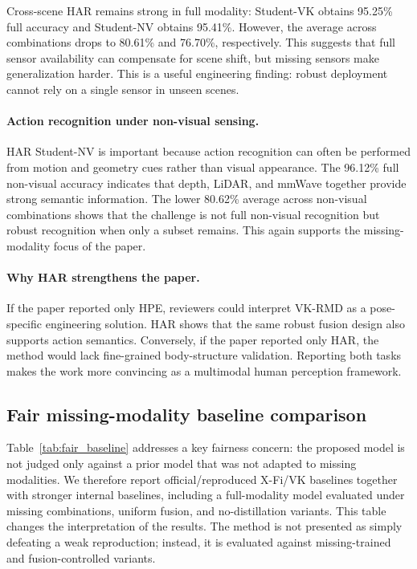 \documentclass[preprint,12pt]{elsarticle}
\newcommand{\method}{VK-RMD}
\begin{document}
Cross-scene HAR remains strong in full modality: Student-VK obtains 95.25\% full accuracy and Student-NV obtains 95.41\%. However, the average across combinations drops to 80.61\% and 76.70\%, respectively. This suggests that full sensor availability can compensate for scene shift, but missing sensors make generalization harder. This is a useful engineering finding: robust deployment cannot rely on a single sensor in unseen scenes.

\paragraph{Action recognition under non-visual sensing.}
HAR Student-NV is important because action recognition can often be performed from motion and geometry cues rather than visual appearance. The 96.12\% full non-visual accuracy indicates that depth, LiDAR, and mmWave together provide strong semantic information. The lower 80.62\% average across non-visual combinations shows that the challenge is not full non-visual recognition but robust recognition when only a subset remains. This again supports the missing-modality focus of the paper.

\paragraph{Why HAR strengthens the paper.}
If the paper reported only HPE, reviewers could interpret \method{} as a pose-specific engineering solution. HAR shows that the same robust fusion design also supports action semantics. Conversely, if the paper reported only HAR, the method would lack fine-grained body-structure validation. Reporting both tasks makes the work more convincing as a multimodal human perception framework.

\subsection{Fair missing-modality baseline comparison}
\label{sec:fair_baseline}

Table~\ref{tab:fair_baseline} addresses a key fairness concern: the proposed model is not judged only against a prior model that was not adapted to missing modalities. We therefore report official/reproduced X-Fi/VK baselines together with stronger internal baselines, including a full-modality model evaluated under missing combinations, uniform fusion, and no-distillation variants. This table changes the interpretation of the results. The method is not presented as simply defeating a weak reproduction; instead, it is evaluated against missing-trained and fusion-controlled variants.
\end{document}
